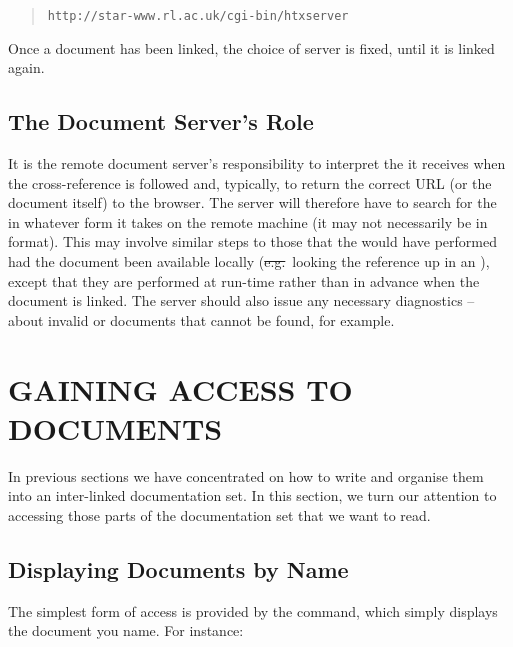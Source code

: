 \begin{quote}
\begin{verbatim}
http://star-www.rl.ac.uk/cgi-bin/htxserver
\end{verbatim}
\end{quote}

Once a document has been linked, the choice of server is fixed, until
it is linked again.

\subsection{\label{sect:docserversrole}The Document Server's Role}

It is the remote document server's responsibility to interpret the
 it receives when the cross-reference is followed and,
typically, to return the correct URL (or the document itself) to the
browser.  The server will therefore have to search for the
 in whatever form it takes on the remote machine (it
may not necessarily be in  format).  This may involve
similar steps to those that the   would
have performed had the document been available locally
(\st{e.g.}\ looking the reference up in an ),
except that they are performed at run-time rather than in advance when
the document is linked. The server should also issue any necessary
diagnostics -- about invalid  or documents that cannot
be found, for example.

\section{\label{sect:accessingdocuments}GAINING ACCESS TO DOCUMENTS}

In previous sections we have concentrated on how to write
 and organise
them into an inter-linked documentation set. In this section, we turn
our attention to accessing those parts of the documentation set that
we want to read.

\subsection{\label{sect:accessingbyname}Displaying Documents by Name}

The simplest form of 
access is provided by the  command, which
simply displays the document you name. For instance:

